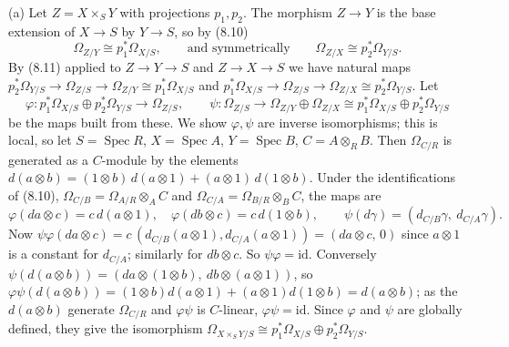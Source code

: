 \documentclass[11pt]{article}
\begin{document}
\pf
(a) Let $Z=X\times_SY$ with projections $p_1,p_2$. The morphism $Z\to Y$ is the base extension of $X\to S$ by $Y\to S$, so by (8.10)
\[\Omega_{Z/Y}\cong p_1^*\Omega_{X/S},\qquad\text{and symmetrically}\qquad \Omega_{Z/X}\cong p_2^*\Omega_{Y/S}.\]
By (8.11) applied to $Z\to Y\to S$ and $Z\to X\to S$ we have natural maps $p_2^*\Omega_{Y/S}\to\Omega_{Z/S}\to\Omega_{Z/Y}\cong p_1^*\Omega_{X/S}$ and $p_1^*\Omega_{X/S}\to\Omega_{Z/S}\to\Omega_{Z/X}\cong p_2^*\Omega_{Y/S}$. Let
\[\varphi:p_1^*\Omega_{X/S}\oplus p_2^*\Omega_{Y/S}\to\Omega_{Z/S},\qquad \psi:\Omega_{Z/S}\to\Omega_{Z/Y}\oplus\Omega_{Z/X}\cong p_1^*\Omega_{X/S}\oplus p_2^*\Omega_{Y/S}\]
be the maps built from these. We show $\varphi,\psi$ are inverse isomorphisms; this is local, so let $S=\operatorname{Spec}R$, $X=\operatorname{Spec}A$, $Y=\operatorname{Spec}B$, $C=A\otimes_RB$. Then $\Omega_{C/R}$ is generated as a $C$-module by the elements $d(a\otimes b)=(1\otimes b)\,d(a\otimes1)+(a\otimes1)\,d(1\otimes b)$. Under the identifications of (8.10), $\Omega_{C/B}=\Omega_{A/R}\otimes_AC$ and $\Omega_{C/A}=\Omega_{B/R}\otimes_BC$, the maps are
\[\varphi(da\otimes c)=c\,d(a\otimes1),\quad\varphi(db\otimes c)=c\,d(1\otimes b),\qquad\psi(d\gamma)=(d_{C/B}\gamma,\ d_{C/A}\gamma).\]
Now $\psi\varphi(da\otimes c)=c\,(d_{C/B}(a\otimes1),d_{C/A}(a\otimes 1))=(da\otimes c,\,0)$ since $a\otimes1$ is a constant for $d_{C/A}$; similarly for $db\otimes c$. So $\psi\varphi=\mathrm{id}$. Conversely $\psi(d(a\otimes b))=(da\otimes(1\otimes b),\ db\otimes(a\otimes1))$, so $\varphi\psi(d(a\otimes b))=(1\otimes b)d(a\otimes1)+(a\otimes1)d(1\otimes b)=d(a\otimes b)$; as the $d(a\otimes b)$ generate $\Omega_{C/R}$ and $\varphi\psi$ is $C$-linear, $\varphi\psi=\mathrm{id}$. Since $\varphi$ and $\psi$ are globally defined, they give the isomorphism $\Omega_{X\times_SY/S}\cong p_1^*\Omega_{X/S}\oplus p_2^*\Omega_{Y/S}$.
\end{document}
